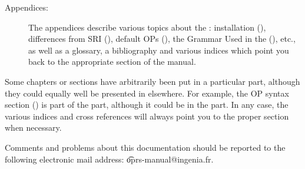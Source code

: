 \begin{description}
\item[Appendices:] The appendices describe various topics about the \COPRSDE{}:
installation (),
differences from SRI \OPRS{} (),
default OPs (), the Grammar Used in the \COPRSDE{}
(), etc., as well as a glossary, a bibliography
and various indices which point you back to the appropriate section of the
manual.

\end{description}

Some chapters or sections have arbitrarily been put in a particular
part, although they could equally well be presented in elsewhere.
For example, the OP syntax section () is
part of the \CPK{} part, although it could be in the \OPE{} part. In
any case, the various indices and cross references will always point
you to the proper section when necessary.

Comments and problems about this documentation should be reported to the
following electronic mail address: \t{oprs-manual@ingenia.fr}.



